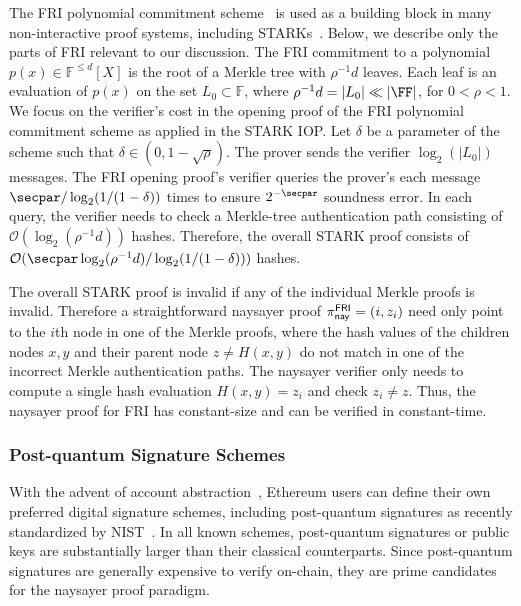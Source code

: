 The FRI polynomial commitment scheme~\cite{EPRINT:BBHR18} is used as a building block in many non-interactive proof systems, including STARKs~\cite{STOC:BCGT13}.
Below, we describe only the parts of FRI relevant to our discussion. The FRI commitment to a polynomial $p(x)\in\mathbb{F}^{\leq d}[X]$ is the root of a Merkle tree with $\rho^{-1}d$ leaves. 
Each leaf is an evaluation of $p(x)$ on the set $L_0\subset\mathbb{F}$, where $\rho^{-1}d=\vert L_0\vert\ll\vert\FF\vert$, for $0<\rho<1$. We focus on the verifier's cost in the opening proof of the FRI polynomial commitment scheme as applied in the STARK IOP. Let $\delta$ be a parameter of the scheme such that $\delta\in(0,1-\sqrt{\rho})$. The prover sends the verifier $\log_2(\vert L_0\vert)$ messages. The FRI opening proof's verifier queries the prover's each message $\secpar/\log_2(1/(1-\delta))$ times to ensure $2^{-\secpar}$ soundness error. In each query, the verifier needs to check a Merkle-tree authentication path consisting of $\mathcal{O}(\log_2(\rho^{-1}d))$ hashes. Therefore, the overall STARK proof consists of $\mathcal{O}(\secpar\log_2(\rho^{-1}d)/\log_2(1/(1-\delta)))$ hashes. 

The overall STARK proof is invalid if any of the individual Merkle proofs is invalid. Therefore a straightforward naysayer proof $\pi^{\mathsf{FRI}}_{\mathsf{nay}}=(i,z_{i})$ need only point to the $i$th node in one of the Merkle proofs, where the hash values of the children nodes $x,y$ and their parent node $z\neq H(x,y)$ do not match in one of the incorrect Merkle authentication paths. The naysayer verifier only needs to compute a single hash evaluation $H(x,y)=z_{i}$ and check $z_{i}\neq z$. Thus, the naysayer proof for FRI has constant-size and can be verified in constant-time. 

\subsubsection{Post-quantum Signature Schemes}\label{sec:pqsig_naysayer}
With the advent of account abstraction~\cite{accountabstraction}, Ethereum users can define their own preferred digital signature schemes, including post-quantum signatures as recently standardized by NIST~\cite{CCS:BHKNRS19,TCHES:DKLLS18,NISTPQC:FALCON22}.
In all known schemes, %
post-quantum signatures or public keys are substantially larger than their classical counterparts.  Since post-quantum signatures are generally expensive to verify on-chain, they are prime candidates for the naysayer proof paradigm.

